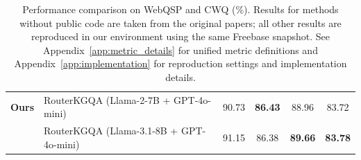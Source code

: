 \documentclass[11pt]{article}
\begin{document}
\begin{table}[t]
{\begin{tabular}{llcccc}
\midrule
\textbf{Ours} & RouterKGQA (Llama-2-7B + GPT-4o-mini) & 90.73 & \textbf{86.43} & 88.96 & 83.72 \\
 & RouterKGQA (Llama-3.1-8B + GPT-4o-mini) & 91.15 & 86.38 & \textbf{89.66} & \textbf{83.78} \\
\bottomrule
\end{tabular}}
\caption{Performance comparison on WebQSP and CWQ (\%). Results for methods without public code are taken from the original papers; all other results are reproduced in our environment using the same Freebase snapshot. See Appendix~\ref{app:metric_details} for unified metric definitions and Appendix~\ref{app:implementation} for reproduction settings and implementation details.}
\label{tab:kbqa_performance_simple}
\end{table}

\begin{table}[t]
\centering
\small
{}
\end{table}
\end{document}
